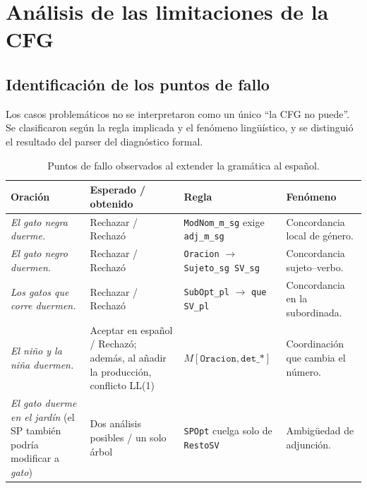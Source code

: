 \section{Análisis de las limitaciones de la CFG}

\subsection{Identificación de los puntos de fallo}
Los casos problemáticos no se interpretaron como un único ``la CFG no puede''. Se clasificaron según la regla implicada y el fenómeno lingüístico, y se distinguió el resultado del parser del diagnóstico formal.

\begin{table}[h!]
\centering
\small
\begin{tabular}{|p{}|p{}|p{}|p{}|}
\hline
\textbf{Oración} & \textbf{Esperado / obtenido} & \textbf{Regla} & \textbf{Fenómeno} \\ \hline
\textit{El gato negra duerme.} & Rechazar / Rechazó & \texttt{ModNom\_m\_sg} exige \texttt{adj\_m\_sg} & Concordancia local de género. \\ \hline
\textit{El gato negro duermen.} & Rechazar / Rechazó & \texttt{Oracion} $\rightarrow$ \texttt{Sujeto\_sg SV\_sg} & Concordancia sujeto--verbo. \\ \hline
\textit{Los gatos que corre duermen.} & Rechazar / Rechazó & \texttt{SubOpt\_pl} $\rightarrow$ \texttt{que SV\_pl} & Concordancia en la subordinada. \\ \hline
\textit{El niño y la niña duermen.} & Aceptar en español / Rechazó; además, al añadir la producción, conflicto LL(1) & $M[\texttt{Oracion},\texttt{det\_*}]$ & Coordinación que cambia el número. \\ \hline
\textit{El gato duerme en el jardín} (el SP también podría modificar a \textit{gato}) & Dos análisis posibles / un solo árbol & \texttt{SPOpt} cuelga solo de \texttt{RestoSV} & Ambigüedad de adjunción. \\ \hline
\end{tabular}
\caption{Puntos de fallo observados al extender la gramática al español.}
\end{table}

